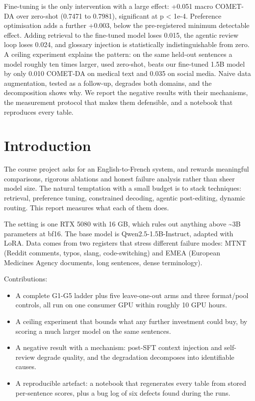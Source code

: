 \documentclass[a4paper,12pt,oneside]{article}
\begin{document}
Fine-tuning is the only intervention with a large effect: +0.051 macro COMET-DA over zero-shot
(0.7471 to 0.7981), significant at p < 1e-4. Preference optimisation adds a further +0.003,
below the pre-registered minimum detectable effect. Adding retrieval to the fine-tuned model
loses 0.015, the agentic review loop loses 0.024, and glossary injection is statistically
indistinguishable from zero. A ceiling experiment explains the pattern: on the same held-out
sentences a model roughly ten times larger, used zero-shot, beats our fine-tuned 1.5B model by
only 0.010 COMET-DA on medical text and 0.035 on social media. Naive data augmentation, tested
as a follow-up, degrades both domains, and the decomposition shows why. We report the negative
results with their mechanisms, the measurement protocol that makes them defensible, and a
notebook that reproduces every table.

\section{Introduction}

The course project asks for an English-to-French system, and rewards meaningful comparisons,
rigorous ablations and honest failure analysis rather than sheer model size. The natural
temptation with a small budget is to stack techniques: retrieval, preference tuning, constrained
decoding, agentic post-editing, dynamic routing. This report measures what each of them does.

The setting is one RTX 5080 with 16 GB, which rules out anything above \textasciitilde{}3B parameters at bf16.
The base model is Qwen2.5-1.5B-Instruct, adapted with LoRA. Data comes from two registers that
stress different failure modes: MTNT (Reddit comments, typos, slang, code-switching) and EMEA
(European Medicines Agency documents, long sentences, dense terminology).

Contributions:

\begin{itemize}\setlength{\itemsep}{2pt}
  \item A complete G1-G5 ladder plus five leave-one-out arms and three format/pool controls, all run on one consumer GPU within roughly 10 GPU hours.
  \item A ceiling experiment that bounds what any further investment could buy, by scoring a much larger model on the same sentences.
  \item A negative result with a mechanism: post-SFT context injection and self-review degrade quality, and the degradation decomposes into identifiable causes.
  \item A reproducible artefact: a notebook that regenerates every table from stored per-sentence scores, plus a bug log of six defects found during the runs.
\end{itemize}
\end{document}
